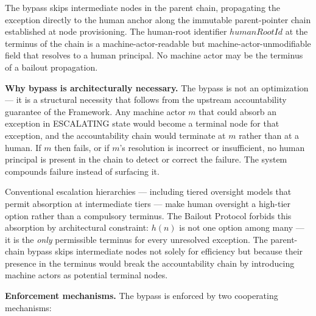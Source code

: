 The bypass skips intermediate nodes in the parent chain, propagating the exception directly to the human anchor along the immutable parent-pointer chain established at node provisioning. The human-root identifier $humanRootId$ at the terminus of the chain is a machine-actor-readable but machine-actor-unmodifiable field that resolves to a human principal. No machine actor may be the terminus of a bailout propagation.

\medskip\noindent\textbf{Why bypass is architecturally necessary.} The bypass is not an optimization — it is a structural necessity that follows from the upstream accountability guarantee of the \bxthree{} Framework. Any machine actor $m$ that could absorb an exception in ESCALATING state would become a terminal node for that exception, and the accountability chain would terminate at $m$ rather than at a human. If $m$ then fails, or if $m$'s resolution is incorrect or insufficient, no human principal is present in the chain to detect or correct the failure. The system compounds failure instead of surfacing it.

Conventional escalation hierarchies — including tiered oversight models that permit absorption at intermediate tiers — make human oversight a high-tier option rather than a compulsory terminus. The Bailout Protocol forbids this absorption by architectural constraint: $h(n)$ is not one option among many — it is the \emph{only} permissible terminus for every unresolved exception. The parent-chain bypass skips intermediate nodes not solely for efficiency but because their presence in the terminus would break the accountability chain by introducing machine actors as potential terminal nodes.

\medskip\noindent\textbf{Enforcement mechanisms.} The bypass is enforced by two cooperating mechanisms:

